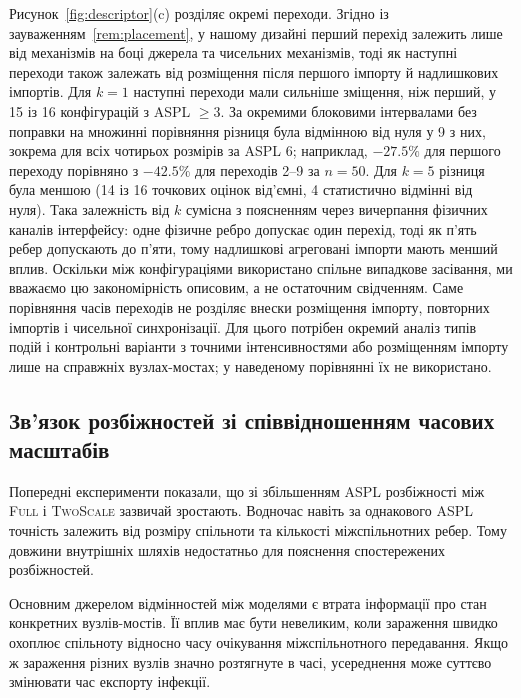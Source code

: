 \documentclass[a4paper,fleqn]{cas-sc}
\newcommand{\Full}{\textup{\textsc{Full}}}
\newcommand{\TS}{\textup{\textsc{TwoScale}}}
\begin{document}
Рисунок~\ref{fig:descriptor}(c) розділяє окремі переходи. Згідно із зауваженням~\ref{rem:placement}, у нашому дизайні перший перехід залежить лише від механізмів на боці джерела та чисельних механізмів, тоді як наступні переходи також залежать від розміщення після першого імпорту й надлишкових імпортів. Для $k=1$ наступні переходи мали сильніше зміщення, ніж перший, у 15 із 16 конфігурацій з ASPL $\ge3$. За окремими блоковими інтервалами без поправки на множинні порівняння різниця була відмінною від нуля у 9 з них, зокрема для всіх чотирьох розмірів за ASPL 6; наприклад, $-27.5\%$ для першого переходу порівняно з $-42.5\%$ для переходів 2--9 за $n=50$. Для $k=5$ різниця була меншою (14 із 16 точкових оцінок від'ємні, 4 статистично відмінні від нуля). Така залежність від $k$ сумісна з поясненням через вичерпання фізичних каналів інтерфейсу: одне фізичне ребро допускає один перехід, тоді як п'ять ребер допускають до п'яти, тому надлишкові агреговані імпорти мають менший вплив. Оскільки між конфігураціями використано спільне випадкове засівання, ми вважаємо цю закономірність описовим, а не остаточним свідченням. Саме порівняння часів переходів не розділяє внески розміщення імпорту, повторних імпортів і чисельної синхронізації. Для цього потрібен окремий аналіз типів подій і контрольні варіанти з точними інтенсивностями або розміщенням імпорту лише на справжніх вузлах-мостах; у наведеному порівнянні їх не використано.











\subsection{Зв'язок розбіжностей
зі співвідношенням часових масштабів}
\label{sec:res_descriptor}

Попередні експерименти показали,
що зі збільшенням ASPL розбіжності
між \Full{} і \TS{} зазвичай зростають.
Водночас навіть за однакового ASPL
точність залежить від розміру спільноти
та кількості міжспільнотних ребер.
Тому довжини внутрішніх шляхів
недостатньо для пояснення
спостережених розбіжностей.

Основним джерелом відмінностей
між моделями є втрата інформації
про стан конкретних вузлів-мостів.
Її вплив має бути невеликим,
коли зараження швидко охоплює
спільноту відносно часу очікування
міжспільнотного передавання.
Якщо ж зараження різних вузлів
значно розтягнуте в часі,
усереднення може суттєво змінювати
час експорту інфекції.
\end{document}
